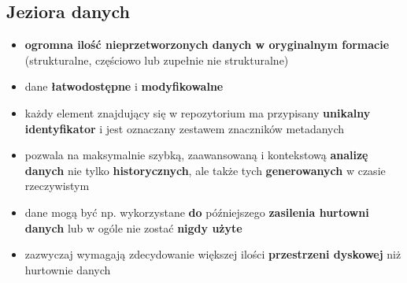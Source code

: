 \documentclass[a4paper]{article}
\begin{document}
    \subsection{Jeziora danych}
    \begin{itemize}[noitemsep]
        \item \textbf{ogromna ilość nieprzetworzonych danych w oryginalnym formacie} (strukturalne, częściowo lub
        zupełnie nie strukturalne)
        \item dane \textbf{łatwodostępne} i \textbf{modyfikowalne}
        \item każdy element znajdujący się w repozytorium ma przypisany
        \textbf{unikalny identyfikator} i jest oznaczany zestawem znaczników metadanych
        \item pozwala na maksymalnie szybką, zaawansowaną i kontekstową \textbf{analizę danych} nie tylko
        \textbf{historycznych}, ale
        także tych \textbf{generowanych} w czasie rzeczywistym
        \item dane mogą być np. wykorzystane \textbf{do} późniejszego \textbf{zasilenia hurtowni danych} lub w ogóle
        nie zostać \textbf{nigdy użyte}
        \item zazwyczaj wymagają zdecydowanie większej ilości \textbf{przestrzeni dyskowej} niż hurtownie danych
    \end{itemize}
\end{document}
